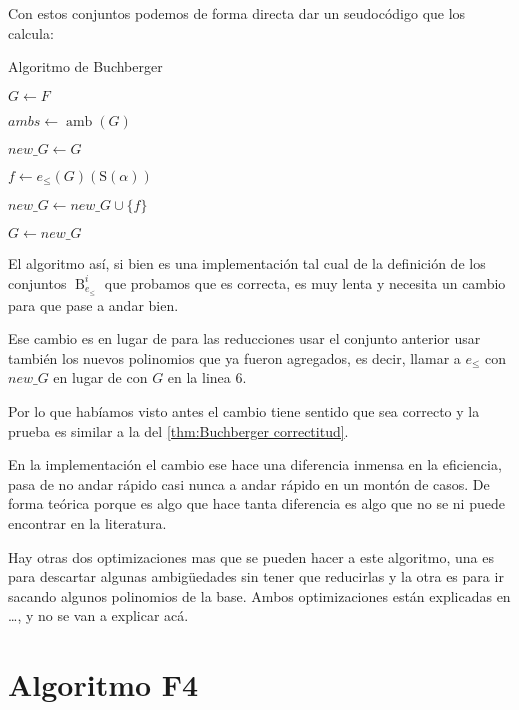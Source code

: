 \documentclass{report}
\theoremstyle{customstyle}
\theoremstyle{factstyle}
\DeclareMathOperator{\amb}{amb}
\renewcommand{\S}{\text{S}}
\DeclareMathOperator{\B}{B}
\begin{document}
Con estos conjuntos podemos de forma directa dar un seudocódigo que los calcula:

\begin{algorithm}[H] %
  \caption{Algoritmo de Buchberger}\label{alg:Buchberger}
  $G ← F$

  \Loop{} {
    $ambs ← \amb(G)$

    $new\_G ← G$

     {
      $f ← e_≤(G)(\S(α))$

       {
        $new\_G ← new\_G ∪ \{f\}$
      }
    }

     {
      \Break
    }

    $G ← new\_G$
  }
\end{algorithm}

El algoritmo así, si bien es una implementación tal cual de la definición de los conjuntos $\B_{e_≤}^i$ que probamos que es correcta, es muy lenta y necesita un cambio para que pase a andar bien.

Ese cambio es en lugar de para las reducciones usar el conjunto anterior usar también los nuevos polinomios que ya fueron agregados, es decir, llamar a $e_≤$ con $new\_G$ en lugar de con $G$ en la linea 6. %

Por lo que habíamos visto antes el cambio tiene sentido que sea correcto y la prueba es similar a la del \cref{thm:Buchberger correctitud}.

En la implementación el cambio ese hace una diferencia inmensa en la eficiencia, pasa de no andar rápido casi nunca a andar rápido en un montón de casos. De forma teórica porque es algo que hace tanta diferencia es algo que no se ni puede encontrar en la literatura.

Hay otras dos optimizaciones mas que se pueden hacer a este algoritmo, una es para descartar algunas ambigüedades sin tener que reducirlas y la otra es para ir sacando algunos polinomios de la base. Ambos optimizaciones están explicadas en …, %
y no se van a explicar acá.

\section{Algoritmo F4}
\end{document}
